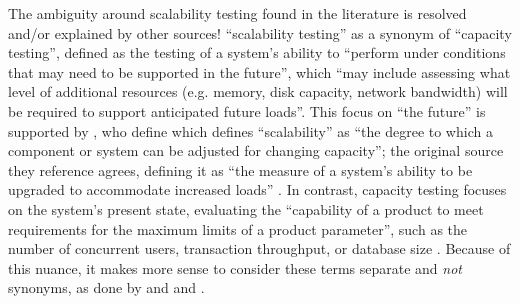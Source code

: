 The ambiguity around scalability testing found in the literature is resolved
and/or explained by other sources! \citet[p.~39]{IEEE2021} 
``scalability testing'' as a synonym of ``capacity testing'', defined
as the testing of a system's ability to ``perform under conditions that may
need to be supported in the future'', which ``may include assessing what level
of additional resources (e.g. memory, disk capacity, network bandwidth) will
be required to support anticipated future loads''. This focus on ``the future''
is supported by \citetISTQB{}, \ifnotpaper who define \else which defines \fi
``scalability'' as ``the degree to which a component or system can be adjusted
for changing capacity''\ifnotpaper; the original source they reference agrees,
defining it as ``the measure of a system's ability to be upgraded to
accommodate increased loads'' \citep[p.~381]{GerrardAndThompson2002}\fi. In
contrast, capacity testing focuses on the system's present state, evaluating
the ``capability of a product to meet requirements for the maximum limits of a
product parameter'', such as the number of concurrent users, transaction
throughput, or database size \citep{ISO_IEC2023a}. Because of this nuance, it
makes more sense to consider these terms separate and \emph{not} synonyms, as
done by
\ifnotpaper \citet[p.~53]{Firesmith2015} and \citet[pp.~22-23]{Bas2024}%
\else \cite[p.~53]{Firesmith2015} and \cite[pp.~22-23]{Bas2024}%
\fi.

